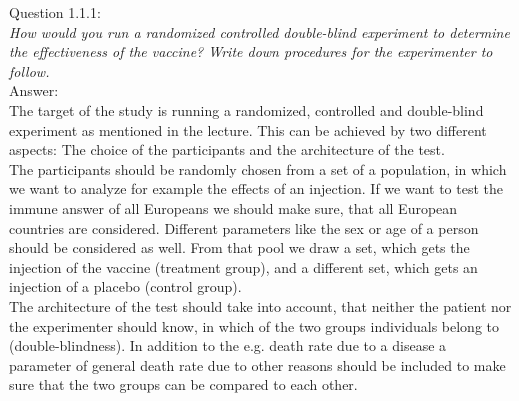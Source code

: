 
Question 1.1.1:\\	
\textsl{How would you run a randomized controlled double-blind experiment to determine the effectiveness of the vaccine? Write down procedures for the experimenter to follow.}\\

Answer:\\
The target of the study is running a randomized, controlled and double-blind experiment as mentioned in the lecture. This can be achieved by two different aspects: The choice of the participants and the architecture of the test.\\

The participants should be randomly chosen from a set of a population, in which we want to analyze for example the effects of an injection. If we want to test the immune answer of all Europeans we should make sure, that all European countries are considered. Different parameters like the sex or age of a person should be considered as well. From that pool we draw a set, which gets the injection of the vaccine (treatment group), and a different set, which gets an injection of a placebo (control group).\\

The architecture of the test should take into account, that neither the patient nor the experimenter should know, in which of the two groups individuals belong to (double-blindness). In addition to the e.g. death rate due to a disease a parameter of general death rate due to other reasons should be included to make sure that the two groups can be compared to each other.\\
